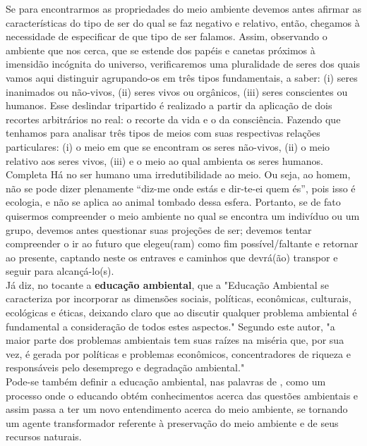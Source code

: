 Se para encontrarmos as propriedades do meio ambiente devemos antes afirmar as características
do tipo de ser do qual se faz negativo e relativo, então, chegamos à necessidade
de especificar de que tipo de ser falamos. Assim, observando o ambiente que nos cerca, que se
estende dos papéis e canetas próximos à imensidão incógnita do universo, verificaremos uma
pluralidade de seres dos quais vamos aqui distinguir agrupando-os em três tipos fundamentais,
a saber: (i) seres inanimados ou não-vivos, (ii) seres vivos ou orgânicos, (iii) seres conscientes
ou humanos. Esse deslindar tripartido é realizado a partir da aplicação de dois recortes arbitrários
no real: o recorte da vida e o da consciência. Fazendo que tenhamos para analisar três tipos
de meios com suas respectivas relações particulares: (i) o meio em que se encontram os seres
não-vivos, (ii) o meio relativo aos seres vivos, (iii) e o meio ao qual ambienta os seres humanos.\\

Completa  Há no ser humano uma irredutibilidade ao meio. Ou seja, ao homem, não se pode dizer
plenamente “diz-me onde estás e dir-te-ei quem és”, pois isso é ecologia, e não se aplica ao
animal tombado dessa esfera. Portanto, se de fato quisermos compreender o meio ambiente
no qual se encontra um indivíduo ou um grupo, devemos antes questionar suas projeções de
ser; devemos tentar compreender o ir ao futuro que elegeu(ram) como fim possível/faltante e
retornar ao presente, captando neste os entraves e caminhos que devrá(ão) transpor e seguir
para alcançá-lo(s).\\

Já   diz, no tocante a \textbf{educação ambiental}, que a "Educação Ambiental se caracteriza por
incorporar as dimensões sociais, políticas, econômicas,
culturais, ecológicas e éticas, deixando claro que ao discutir
qualquer problema ambiental é fundamental a consideração
de todos estes aspectos." Segundo este autor, "a maior parte
dos problemas ambientais tem suas raízes na miséria que,
por sua vez, é gerada por políticas e problemas econômicos,
concentradores de riqueza e responsáveis pelo desemprego
e degradação ambiental."\\

Pode-se também definir a educação ambiental, nas palavras de , como um processo
onde o educando obtém conhecimentos acerca das
questões ambientais e assim passa a ter um novo
entendimento acerca do meio ambiente, se tornando um
agente transformador referente à preservação do meio
ambiente e de seus recursos naturais. \\


